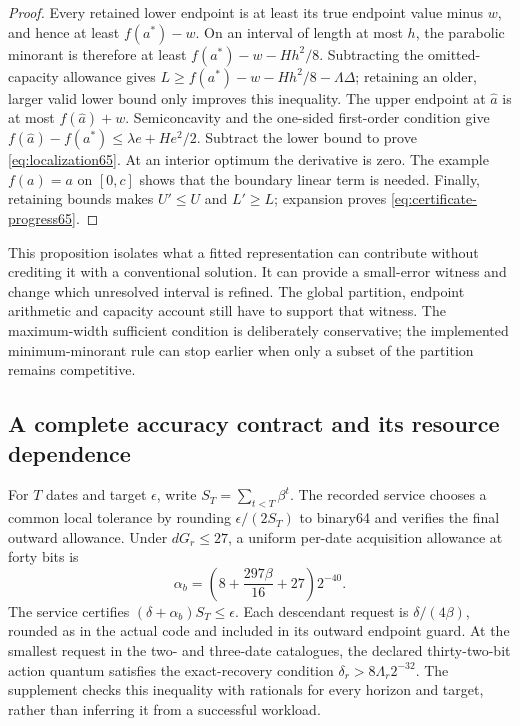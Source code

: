 \begin{proof}
Every retained lower endpoint is at least its true endpoint value minus $w$, and hence at least $f(a^*)-w$. On an interval of length at most $h$, the parabolic minorant is therefore at least $f(a^*)-w-Hh^2/8$. Subtracting the omitted-capacity allowance gives
$L\ge f(a^*)-w-Hh^2/8-\Lambda\Delta$; retaining an older, larger valid lower bound only improves this inequality. The upper endpoint at $\widehat a$ is at most $f(\widehat a)+w$. Semiconcavity and the one-sided first-order condition give
$f(\widehat a)-f(a^*)\le\lambda e+He^2/2$. Subtract the lower bound to prove \eqref{eq:localization65}. At an interior optimum the derivative is zero. The example $f(a)=a$ on $[0,c]$ shows that the boundary linear term is needed. Finally, retaining bounds makes $U'\le U$ and $L'\ge L$; expansion proves \eqref{eq:certificate-progress65}.
\end{proof}

This proposition isolates what a fitted representation can contribute without crediting it with a conventional solution. It can provide a small-error witness and change which unresolved interval is refined. The global partition, endpoint arithmetic and capacity account still have to support that witness. The maximum-width sufficient condition is deliberately conservative; the implemented minimum-minorant rule can stop earlier when only a subset of the partition remains competitive.

\subsection{A complete accuracy contract and its resource dependence}
For $T$ dates and target $\epsilon$, write $S_T=\sum_{t<T}\beta^t$. The recorded service chooses a common local tolerance by rounding $\epsilon/(2S_T)$ to binary64 and verifies the final outward allowance. Under $dG_r\le27$, a uniform per-date acquisition allowance at forty bits is
\[
 \alpha_b=\left(8+\frac{297\beta}{16}+27\right)2^{-40}.
\]
The service certifies $(\delta+\alpha_b)S_T\le\epsilon$. Each descendant request is $\delta/(4\beta)$, rounded as in the actual code and included in its outward endpoint guard. At the smallest request in the two- and three-date catalogues, the declared thirty-two-bit action quantum satisfies the exact-recovery condition $\delta_r>8\Lambda_r2^{-32}$. The supplement checks this inequality with rationals for every horizon and target, rather than inferring it from a successful workload.


